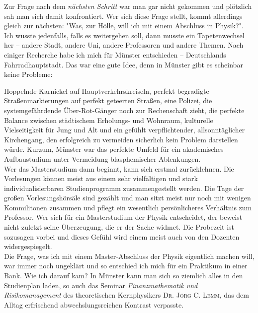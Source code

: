 \begin{multicols}{2}
Zur Frage nach dem \textit{nächsten Schritt} war man gar nicht gekommen und plötzlich sah man sich damit konfrontiert.
Wer sich diese Frage stellt, kommt allerdings gleich zur nächsten: "Was, zur Hölle, will ich mit einem Abschluss in Physik?". \\ 

Ich wusste jedenfalls, falls es weitergehen soll, dann musste ein Tapetenwechsel her – andere Stadt, andere Uni, andere Professoren und andere Themen.
Nach einiger Recherche habe ich mich für Münster entschieden – Deutschlands Fahrradhauptstadt.
Das war eine gute Idee, denn in Münster gibt es scheinbar keine Probleme: 

Hoppelnde Karnickel auf Hauptverkehrskreiseln, perfekt begradigte Straßenmarkierungen auf perfekt geteerten Straßen, eine Polizei, die systemgefährdende Über-Rot-Gänger noch zur Rechenschaft zieht, die perfekte Balance zwischen städtischem Erholungs- und Wohnraum, kulturelle Vielseitigkeit für Jung und Alt und ein gefühlt verpflichtender, allsonntäglicher Kirchengang, den erfolgreich zu vermeiden sicherlich kein Problem darstellen würde. Kurzum, Münster war das perfekte Umfeld für ein akademisches Aufbaustudium unter Vermeidung blasphemischer Ablenkungen. \\ 

Wer das Masterstudium dann beginnt, kann sich erstmal zurücklehnen.
Die Vorlesungen können meist aus einem sehr vielfältigen und stark individualisierbaren Studienprogramm zusammengestellt werden. 
Die Tage der großen Vorlesungshörsäle sind gezählt und man sitzt meist nur noch mit wenigen Kommilitonen zusammen und pflegt ein wesentlich
persönlicheres Verhältnis zum Professor.
Wer sich für ein Masterstudium der Physik entscheidet, der beweist nicht zuletzt seine Überzeugung, die er der Sache widmet.
Die Probezeit ist sozusagen vorbei und dieses Gefühl wird einem meist auch von den Dozenten widergespiegelt. \\ 

Die Frage, was ich mit einem Master-Abschluss der Physik eigentlich machen will, war immer noch ungeklärt und so entschied ich mich für ein Praktikum in einer Bank.
Wie ich darauf kam? In Münster kann man sich so ziemlich alles in den Studienplan laden,
so auch das Seminar \textit{Finanzmathematik und Risikomanagement} des theoretischen Kernphysikers \textsc{Dr. Jörg C. Lemm}, das dem Alltag erfrischend abwechslungsreichen Kontrast verpasste. \\ 


\end{multicols}
